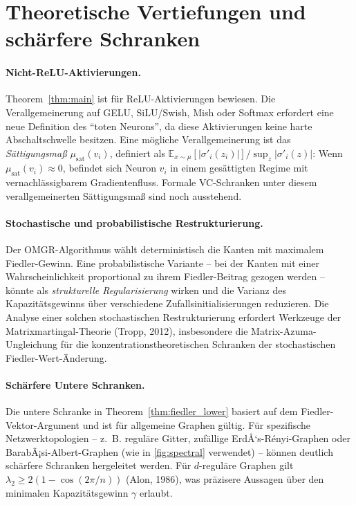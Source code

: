 ﻿\documentclass[12pt, a4paper, openany]{report}
\newcommand{\E}{\mathbb{E}}
\begin{document}
\section{Theoretische Vertiefungen und schärfere Schranken}
\label{sec:outlook_theory}

\paragraph{Nicht-ReLU-Aktivierungen.}
Theorem~\ref{thm:main} ist für ReLU-Aktivierungen bewiesen.  Die
Verallgemeinerung auf GELU, SiLU/Swish, Mish oder Softmax erfordert
eine neue Definition des ``toten Neurons'', da diese Aktivierungen keine
harte Abschaltschwelle besitzen.  Eine mögliche Verallgemeinerung ist das
\emph{Sättigungsmaß} $\mu_{\mathrm{sat}}(v_i)$, definiert als
$\E_{x \sim \mu}[|\sigma'_i(z_i)|] / \sup_{z} |\sigma'_i(z)|$: Wenn
$\mu_{\mathrm{sat}}(v_i) \approx 0$, befindet sich Neuron $v_i$ in einem
gesättigten Regime mit vernachlässigbarem Gradientenfluss.  Formale
VC-Schranken unter diesem verallgemeinerten Sättigungsmaß sind noch
ausstehend.

\paragraph{Stochastische und probabilistische Restrukturierung.}
Der OMGR-Algorithmus wählt deterministisch die Kanten mit maximalem
Fiedler-Gewinn.  Eine probabilistische Variante -- bei der Kanten mit
einer Wahrscheinlichkeit proportional zu ihrem Fiedler-Beitrag gezogen
werden -- könnte als \emph{strukturelle Regularisierung} wirken und
die Varianz des Kapazitätsgewinns über verschiedene Zufallsinitialisierungen
reduzieren.  Die Analyse einer solchen stochastischen Restrukturierung
erfordert Werkzeuge der Matrixmartingal-Theorie (Tropp, 2012), insbesondere
die Matrix-Azuma-Ungleichung für die konzentrationstheoretischen
Schranken der stochastischen Fiedler-Wert-Änderung.

\paragraph{Schärfere Untere Schranken.}
Die untere Schranke in Theorem~\ref{thm:fiedler_lower} basiert auf dem
Fiedler-Vektor-Argument und ist für allgemeine Graphen gültig.  Für
spezifische Netzwerktopologien -- z.~B. reguläre Gitter, zufällige
ErdÅ‘s-Rényi-Graphen oder BarabÃ¡si-Albert-Graphen (wie in
\cref{fig:spectral} verwendet) -- können deutlich schärfere
Schranken hergeleitet werden.  Für $d$-reguläre Graphen gilt
$\lambda_2 \geq 2(1 - \cos(2\pi/n))$ (Alon, 1986), was präzisere
Aussagen über den minimalen Kapazitätsgewinn $\gamma$ erlaubt.
\end{document}
